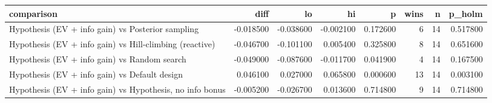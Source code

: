\begin{tabular}{lrrrrrrr}
\toprule
comparison & diff & lo & hi & p & wins & n & p\_holm \\
\midrule
Hypothesis (EV + info gain) vs Posterior sampling & -0.018500 & -0.038600 & -0.002100 & 0.172600 & 6 & 14 & 0.517800 \\
Hypothesis (EV + info gain) vs Hill-climbing (reactive) & -0.046700 & -0.101100 & 0.005400 & 0.325800 & 8 & 14 & 0.651600 \\
Hypothesis (EV + info gain) vs Random search & -0.049000 & -0.087600 & -0.011700 & 0.041900 & 4 & 14 & 0.167500 \\
Hypothesis (EV + info gain) vs Default design & 0.046100 & 0.027000 & 0.065800 & 0.000600 & 13 & 14 & 0.003100 \\
Hypothesis (EV + info gain) vs Hypothesis, no info bonus & -0.005200 & -0.026700 & 0.013600 & 0.714800 & 9 & 14 & 0.714800 \\
\bottomrule
\end{tabular}
